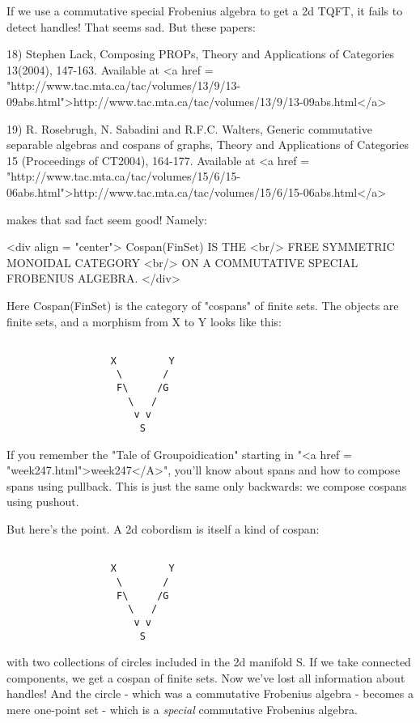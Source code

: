 If we use a commutative special Frobenius algebra to get a 2d TQFT, 
it fails to detect handles!  That seems sad.  But these papers:

18) Stephen Lack, Composing PROPs, Theory and Applications of
Categories 13(2004), 147-163.  Available at <a href = "http://www.tac.mta.ca/tac/volumes/13/9/13-09abs.html">http://www.tac.mta.ca/tac/volumes/13/9/13-09abs.html</a>

19) R. Rosebrugh, N. Sabadini and R.F.C. Walters, Generic commutative 
separable algebras and cospans of graphs, Theory and Applications of 
Categories 15 (Proceedings of CT2004), 164-177.  Available at
<a href = "http://www.tac.mta.ca/tac/volumes/15/6/15-06abs.html">http://www.tac.mta.ca/tac/volumes/15/6/15-06abs.html</a>

makes that sad fact seem good!  Namely:

<div align = "center">
      Cospan(FinSet) IS THE <br/> 
      FREE SYMMETRIC MONOIDAL CATEGORY <br/>
           ON A COMMUTATIVE SPECIAL FROBENIUS ALGEBRA.
</div>

Here Cospan(FinSet) is the category of "cospans" of finite sets.
The objects are finite sets, and a morphism from X to Y looks like
this:


\begin{verbatim}

                  X         Y
                   \       /
                   F\     /G
                     \   /
                      v v
                       S
\end{verbatim}
    

If you remember the "Tale of Groupoidication" starting in
"<a href = "week247.html">week247</A>", you'll know about
spans and how to compose spans using pullback.  This is just the same
only backwards: we compose cospans using pushout.

But here's the point.  A 2d cobordism is itself a kind of cospan:


\begin{verbatim}

                  X         Y
                   \       /
                   F\     /G
                     \   /
                      v v
                       S
\end{verbatim}
    
with two collections of circles included in the 2d manifold S.  If we 
take connected components, we get a cospan of finite sets.  Now we've
lost all information about handles!  And the circle - which was a 
commutative Frobenius algebra - becomes a mere one-point set - which 
is a \emph{special} commutative Frobenius algebra.  


